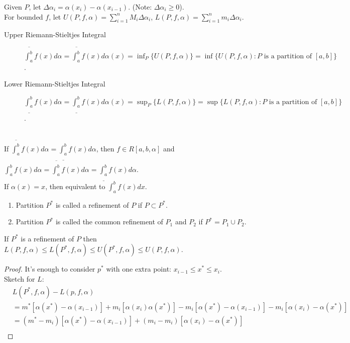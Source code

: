 \begin{define}[2]
	Given $P$, let $\Delta \alpha_i=\alpha(x_{i})-\alpha(x_{i-1})$. (Note: $\Delta \alpha_i\ge 0$).\\
	For bounded $f$, let $U(P,f,\alpha)=\sum_{i=1}^{n}{M_{i} \Delta \alpha_i}$, $L(P,f,\alpha)=\sum_{i=1}^{n}{m_{i}}\Delta \alpha_i$.\\
	\begin{description}
		\item[Upper Riemann-Stieltjes Integral] $\overline{\int_{a}^{b}}f(x)d\alpha=\overline{\int_{a}^{b}}f(x)d\alpha(x)=\inf_{P}\{U(P,f,\alpha)\}=\inf\{U(P,f,\alpha):P\text{ is a partition of }[a,b]\}$.
		\item[Lower Riemann-Stieltjes Integral] $\underline{\int_{a}^{b}}f(x)d\alpha=\underline{\int_{a}^{b}}f(x)d\alpha(x)=\sup_{P}\{L(P,f,\alpha)\}=\sup\{L(P,f,\alpha):P\text{ is a partition of }[a,b]\}$.
	\end{description}\hfill\\
	If $\overline{\int_{a}^{b}}f(x)d\alpha=\underline{\int_{a}^{b}}f(x)d\alpha$, then $f\in R[a,b,\alpha]$ and $\int_{a}^{b}f(x)d\alpha=\overline{\int_{a}^{b}}f(x)d\alpha=\underline{\int_{a}^{b}}f(x)d\alpha$.\\
	If $\alpha(x)=x$, then equivalent to $\int_{a}^{b}f(x)dx$.
\end{define}

\begin{define}[3]
	\begin{enumerate}
		\item Partition $P^{*}$ is called a refinement of $P$ if $P\subset P^{*}$.
		\item Partition $P^{*}$ is called the common refinement of $P_1$ and $P_2$ if $P^{*}=P_1 \cup P_2$.
	\end{enumerate}
\end{define}

\begin{thm}[4]
	If $P^{*}$ is a refinement of $P$ then $L(P,f,\alpha)\le L(P^{*},f,\alpha)\le U(P^{*},f,\alpha)\le U(P,f,\alpha)$.
	\begin{proof}
		It's enough to consider $p^{*}$ with one extra point: $x_{i-1}\le x^{*}\le x_{i}$.\\
		Sketch for $L$:\\
		\begin{align*}
			 & L(P^{*},f,\alpha)-L(p,f,\alpha)                                                   \\
			 & = m^{*}[\alpha(x^{*})-\alpha(x_{i-1})]+m_i[\alpha(x_i)\alpha(x^{*})]
			-m_{i}[\alpha(x^{*})-\alpha(x_{i-1})]-m_i[\alpha(x_i)-\alpha(x^{*})]                 \\
			 & = (m^{*}-m_i)[\alpha(x^{*})-\alpha(x_{i-1})]+(m_i-m_i)[\alpha(x_i)-\alpha(x^{*})] \\
		\end{align*}
	\end{proof}
\end{thm}


